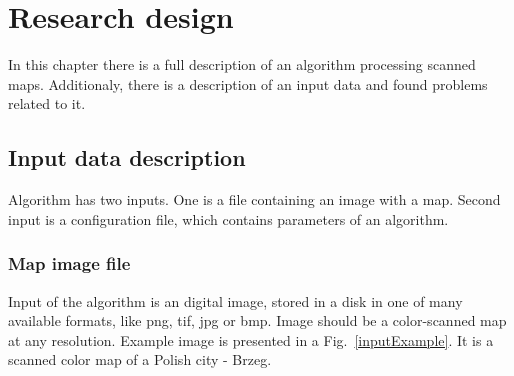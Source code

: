 \documentclass[a4paper,onecolumn,oneside,12pt]{memoir}
\begin{document}
\chapter{Research design}

In this chapter there is a full description of an algorithm processing scanned maps. Additionaly,
there is a description of an input data and found problems related to it.

\section{Input data description}

Algorithm has two inputs. One is a file containing an image with a map. Second input is a
configuration file, which contains parameters of an algorithm.

\subsection{Map image file}

Input of the algorithm is an digital image, stored in a disk in one of many available formats, like
png, tif, jpg or bmp. Image should be a color-scanned map at any resolution. Example image is 
presented in a Fig.~\ref{inputExample}. It is a scanned color map of a Polish city - Brzeg.
\end{document}
